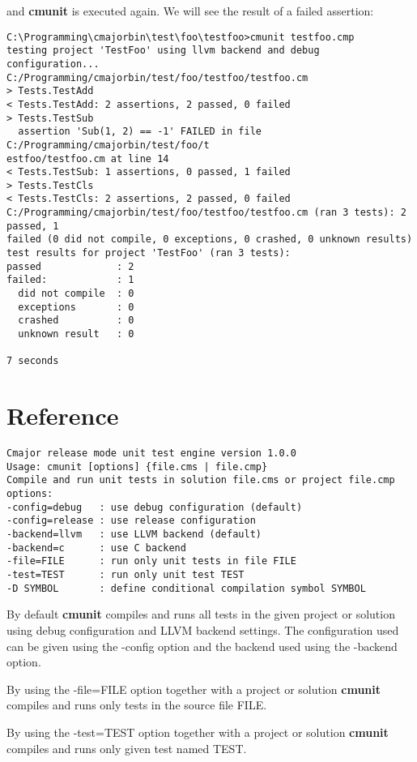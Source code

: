 \documentclass[oneside, a4paper, 11pt]{article}
\begin{document}
and \textbf{cmunit} is executed again. We will see the result of a failed
assertion:

\begin{verbatim}
C:\Programming\cmajorbin\test\foo\testfoo>cmunit testfoo.cmp
testing project 'TestFoo' using llvm backend and debug configuration...
C:/Programming/cmajorbin/test/foo/testfoo/testfoo.cm
> Tests.TestAdd
< Tests.TestAdd: 2 assertions, 2 passed, 0 failed
> Tests.TestSub
  assertion 'Sub(1, 2) == -1' FAILED in file C:/Programming/cmajorbin/test/foo/t
estfoo/testfoo.cm at line 14
< Tests.TestSub: 1 assertions, 0 passed, 1 failed
> Tests.TestCls
< Tests.TestCls: 2 assertions, 2 passed, 0 failed
C:/Programming/cmajorbin/test/foo/testfoo/testfoo.cm (ran 3 tests): 2 passed, 1
failed (0 did not compile, 0 exceptions, 0 crashed, 0 unknown results)
test results for project 'TestFoo' (ran 3 tests):
passed             : 2
failed:            : 1
  did not compile  : 0
  exceptions       : 0
  crashed          : 0
  unknown result   : 0

7 seconds
\end{verbatim}

\section{Reference}

\begin{verbatim}
Cmajor release mode unit test engine version 1.0.0
Usage: cmunit [options] {file.cms | file.cmp}
Compile and run unit tests in solution file.cms or project file.cmp
options:
-config=debug   : use debug configuration (default)
-config=release : use release configuration
-backend=llvm   : use LLVM backend (default)
-backend=c      : use C backend
-file=FILE      : run only unit tests in file FILE
-test=TEST      : run only unit test TEST
-D SYMBOL       : define conditional compilation symbol SYMBOL\end{verbatim}

By default \textbf{cmunit} compiles and runs all tests in the given project or solution
using debug configuration and LLVM backend settings.
The configuration used can be given using the -config option and the backend used
using the -backend option.

By using the -file=FILE option together with a project or solution \textbf{cmunit} compiles and
runs only tests in the source file FILE.

By using the -test=TEST option together with a project or solution \textbf{cmunit} compiles and
runs only given test named TEST.
\end{document}
